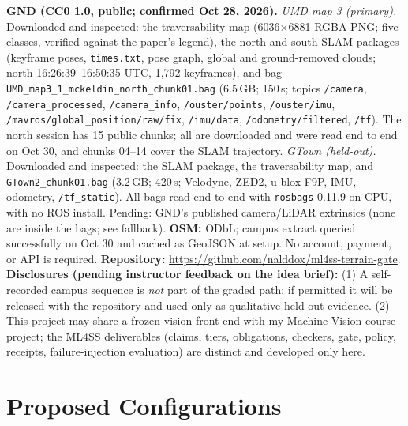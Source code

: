 \documentclass[10pt,letterpaper]{article}
\newcommand{\repourl}{\url{https://github.com/nalddox/ml4ss-terrain-gate}}
\newcommand{\cl}[1]{\texttt{#1}}
\begin{document}
\sloppy\textbf{GND (CC0 1.0, public; confirmed Oct 28, 2026).} \emph{UMD map 3 (primary).} Downloaded and
inspected: the traversability map (6036$\times$6881 RGBA PNG; five classes, verified against the paper's
legend), the north and south SLAM packages (keyframe poses, \cl{times.txt}, pose graph, global and
ground-removed clouds; north 16:26:39--16:50:35 UTC, 1,792 keyframes), and bag
\cl{UMD\_map3\_1\_mckeldin\_north\_}\allowbreak\cl{chunk01.bag} (6.5\,GB; 150\,s; topics \cl{/camera},
\cl{/camera\_processed}, \cl{/camera\_info}, \cl{/ouster/points}, \cl{/ouster/imu},
\cl{/mavros/global\_position/raw/fix}, \cl{/imu/data}, \cl{/odometry/filtered}, \cl{/tf}). The north
session has 15 public chunks; all are downloaded and were read end to end on Oct 30, and chunks 04--14 cover the SLAM trajectory. \emph{GTown (held-out).} Downloaded and inspected: the SLAM package, the
traversability map, and \cl{GTown2\_chunk01.bag} (3.2\,GB; 420\,s; Velodyne, ZED2, u-blox F9P,
IMU, odometry, \cl{/tf\_static}). All bags read end to end with \cl{rosbags} 0.11.9 on CPU, with no
ROS install. Pending: GND's published camera/LiDAR extrinsics (none are inside the bags; see fallback). \textbf{OSM:} ODbL;
campus extract queried successfully on Oct 30 and cached as GeoJSON at setup. No account, payment, or API is required.
\textbf{Repository:} \repourl.
\textbf{Disclosures (pending instructor feedback on the idea brief):} (1) A self-recorded campus
sequence is \emph{not} part of the graded path; if permitted it will be released with the repository
and used only as qualitative held-out evidence. (2) This project may share a frozen vision front-end
with my Machine Vision course project; the ML4SS deliverables (claims, tiers, obligations, checkers,
gate, policy, receipts, failure-injection evaluation) are distinct and developed only here.

\section{Proposed Configurations}
\end{document}
